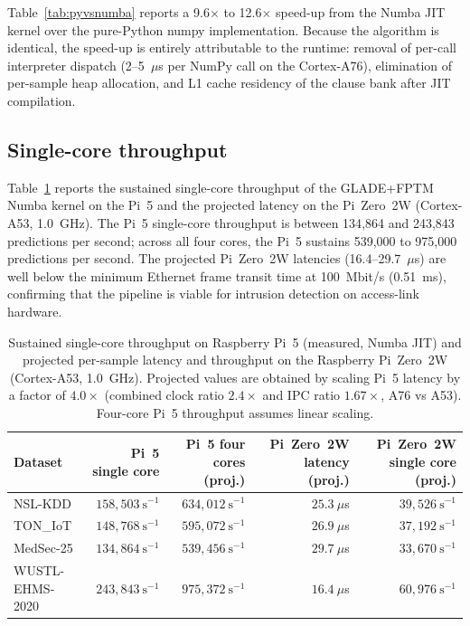 \documentclass[journal,10pt]{IEEEtran}
\begin{document}
Table~\ref{tab:pyvsnumba} reports a 9.6$\times$ to 12.6$\times$ speed-up
from the Numba JIT kernel over the pure-Python numpy implementation. Because
the algorithm is identical, the speed-up is entirely attributable to the
runtime: removal of per-call interpreter dispatch (2--5~$\mu$s per NumPy
call on the Cortex-A76), elimination of per-sample heap allocation, and
L1 cache residency of the clause bank after JIT compilation.

\subsection{Single-core throughput}
\label{sec:res-throughput}

Table~\ref{tab:throughput} reports the sustained single-core throughput of
the GLADE+FPTM Numba kernel on the Pi~5 and the projected latency on the
Pi~Zero~2W (Cortex-A53, 1.0~GHz). The Pi~5 single-core throughput is
between 134{,}864 and 243{,}843 predictions per second; across all four
cores, the Pi~5 sustains 539{,}000 to 975{,}000 predictions per second.
The projected Pi~Zero~2W latencies (16.4--29.7~$\mu$s) are well below the
minimum Ethernet frame transit time at 100~Mbit/s (0.51~ms), confirming
that the pipeline is viable for intrusion detection on access-link hardware.

\begin{table}[t]
\centering\small
\caption{Sustained single-core throughput on Raspberry Pi~5 (measured,
         Numba JIT) and projected per-sample latency and throughput on the
         Raspberry Pi~Zero~2W (Cortex-A53, 1.0~GHz). Projected values are
         obtained by scaling Pi~5 latency by a factor of $4.0\times$
         (combined clock ratio $2.4\times$ and IPC ratio $1.67\times$,
         A76 vs A53). Four-core Pi~5 throughput assumes linear scaling.}
\label{tab:throughput}
\begin{tabular}{lrrrr}
\toprule
\textbf{Dataset}
  & \textbf{Pi~5 single core}
  & \textbf{Pi~5 four cores (proj.)}
  & \textbf{Pi~Zero~2W latency (proj.)}
  & \textbf{Pi~Zero~2W single core (proj.)} \\
\midrule
NSL-KDD         & $158{,}503~\text{s}^{-1}$ & $634{,}012~\text{s}^{-1}$ & $25.3~\mu$s & $39{,}526~\text{s}^{-1}$ \\
TON\_IoT        & $148{,}768~\text{s}^{-1}$ & $595{,}072~\text{s}^{-1}$ & $26.9~\mu$s & $37{,}192~\text{s}^{-1}$ \\
MedSec-25       & $134{,}864~\text{s}^{-1}$ & $539{,}456~\text{s}^{-1}$ & $29.7~\mu$s & $33{,}670~\text{s}^{-1}$ \\
WUSTL-EHMS-2020 & $243{,}843~\text{s}^{-1}$ & $975{,}372~\text{s}^{-1}$ & $16.4~\mu$s & $60{,}976~\text{s}^{-1}$ \\
\bottomrule
\end{tabular}
\end{table}
\end{document}
